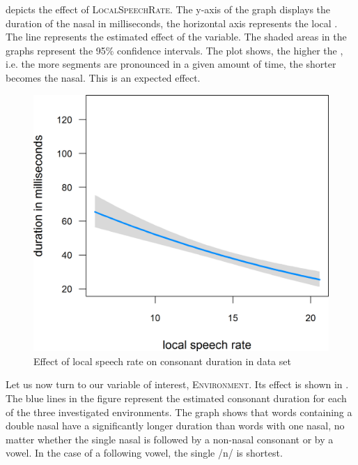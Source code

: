  depicts the effect of \textsc{LocalSpeechRate}.  The y-axis of the graph displays the duration of the nasal in milliseconds, the horizontal axis represents the local . The line represents the estimated effect of the variable. The shaded areas in the graphs represent the 95\% confidence intervals. The  plot shows, the higher the , i.e. the more segments are pronounced in a given amount of time, the shorter becomes the nasal. This is an expected effect.

\begin{figure}[b]
	\includegraphics [scale=0.4]{images/Corpus/unModelSpeechRate.png}
	\caption{Effect of local speech rate on consonant duration in data set}
	\label{fig:SpeechRate un}
\end{figure}\pagebreak


Let us now turn to our variable of interest, \textsc{Environment}. Its effect is shown in . The blue lines in the figure represent the estimated consonant duration for each of the three investigated environments. The graph shows that words containing a double nasal have a significantly longer duration than words with one nasal, no matter whether the single nasal is followed by a non-nasal consonant or by a vowel. In the case of a following vowel, the single /n/ is shortest. 

